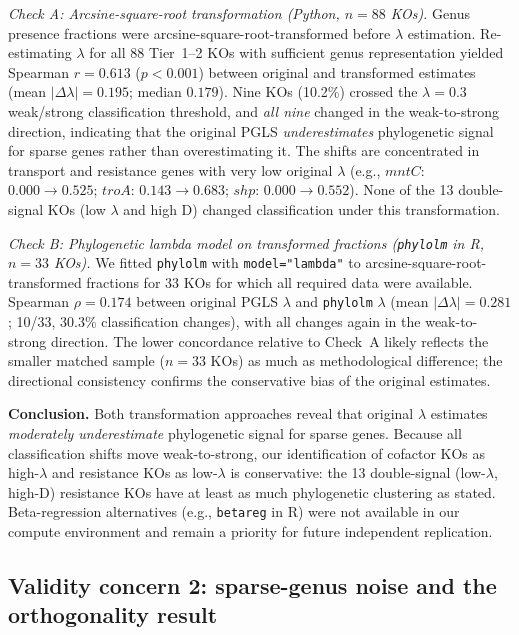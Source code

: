 \documentclass[11pt]{article}
\begin{document}
\textit{Check A: Arcsine-square-root transformation (Python, $n = 88$ KOs).}
Genus presence fractions were arcsine-square-root-transformed before $\lambda$ estimation.
Re-estimating $\lambda$ for all 88 Tier~1--2 KOs with sufficient genus representation yielded Spearman $r = 0.613$ ($p < 0.001$) between original and transformed estimates (mean $|\Delta\lambda| = 0.195$; median $0.179$).
Nine KOs (10.2\%) crossed the $\lambda = 0.3$ weak/strong classification threshold, and \emph{all nine} changed in the weak-to-strong direction, indicating that the original PGLS \emph{underestimates} phylogenetic signal for sparse genes rather than overestimating it.
The shifts are concentrated in transport and resistance genes with very low original $\lambda$ (e.g., $mntC$: $0.000 \to 0.525$; $troA$: $0.143 \to 0.683$; $shp$: $0.000 \to 0.552$).
None of the 13 double-signal KOs (low $\lambda$ and high D) changed classification under this transformation.

\textit{Check B: Phylogenetic lambda model on transformed fractions (\texttt{phylolm} in R, $n = 33$ KOs).}
We fitted \texttt{phylolm} with \texttt{model="lambda"} to arcsine-square-root-transformed fractions for 33 KOs for which all required data were available.
Spearman $\rho = 0.174$ between original PGLS $\lambda$ and \texttt{phylolm} $\lambda$ (mean $|\Delta\lambda| = 0.281$; 10/33, 30.3\% classification changes), with all changes again in the weak-to-strong direction.
The lower concordance relative to Check~A likely reflects the smaller matched sample ($n = 33$ KOs) as much as methodological difference; the directional consistency confirms the conservative bias of the original estimates.

\textbf{Conclusion.}
Both transformation approaches reveal that original $\lambda$ estimates \emph{moderately underestimate} phylogenetic signal for sparse genes.
Because all classification shifts move weak-to-strong, our identification of cofactor KOs as high-$\lambda$ and resistance KOs as low-$\lambda$ is conservative: the 13 double-signal (low-$\lambda$, high-D) resistance KOs have at least as much phylogenetic clustering as stated.
Beta-regression alternatives (e.g., \texttt{betareg} in R) were not available in our compute environment and remain a priority for future independent replication.

\subsection{Validity concern 2: sparse-genus noise and the orthogonality result}
\end{document}

